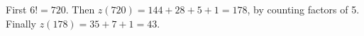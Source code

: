 First $6!=720$. Then $z(720)=144+28+5+1=178$, by counting factors of 5. Finally $z(178)=35+7+1=\boxed{43}$.
